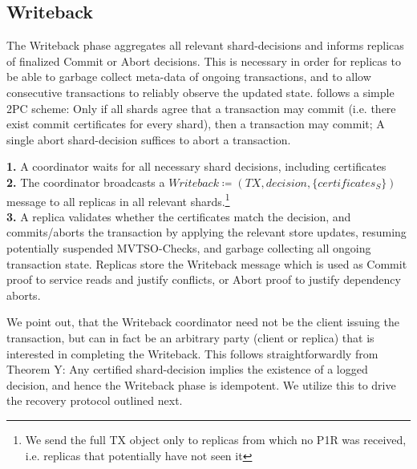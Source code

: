 \subsection{Writeback} 

The Writeback phase aggregates all relevant shard-decisions and informs replicas of finalized Commit or Abort decisions. This is necessary in order for replicas to be able to garbage collect meta-data of ongoing transactions, and to allow consecutive transactions to reliably observe the updated state. \sys follows a simple 2PC scheme: Only if all shards agree that a transaction may commit (i.e. there exist commit certificates for every shard), then a transaction may commit; A single abort shard-decision suffices to abort a transaction.

\textbf{1.} A coordinator waits for all necessary shard decisions, including certificates\\
\textbf{2.} The coordinator broadcasts a $Writeback \coloneqq (TX, decision, \{certificates_S \} )$ message to all replicas in all relevant shards.\footnote{We send the full TX object only to replicas from which no P1R was received, i.e. replicas that potentially have not seen it}\\
\textbf{3.} A replica validates whether the certificates match the decision, and commits/aborts the transaction by applying the relevant store updates, resuming potentially suspended MVTSO-Checks, and garbage collecting all ongoing transaction state. Replicas store the Writeback message which is used as Commit proof to service reads and justify conflicts, or Abort proof to justify dependency aborts.

We point out, that the Writeback coordinator need not be the client issuing the transaction, but can in fact be an arbitrary party (client or replica) that is interested in completing the Writeback. This follows straightforwardly from Theorem Y: Any certified shard-decision implies the existence of a logged decision, and hence the Writeback phase is idempotent.
We utilize this to drive the recovery protocol outlined next. 

